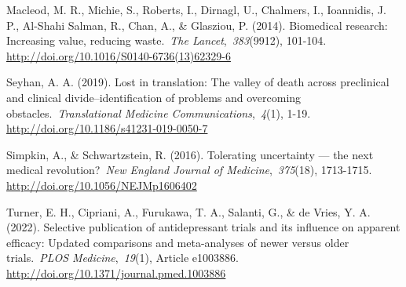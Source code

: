 \documentclass[authordate, empirical]{jote-new-article}
\begin{document}
	Macleod, M. R., Michie, S., Roberts, I., Dirnagl, U., Chalmers, I., Ioannidis, J. P., Al-Shahi Salman, R., Chan, A., \& Glasziou, P. (2014). Biomedical research: Increasing value, reducing waste. \emph{The Lancet}, \emph{383}(9912), 101-104. \url{http://doi.org/10.1016/S0140-6736(13)62329-6} 
	
	Seyhan, A. A. (2019). Lost in translation: The valley of death across preclinical and clinical divide--identification of problems and overcoming obstacles. \emph{Translational Medicine Communications}, \emph{4}(1), 1-19. \url{http://doi.org/10.1186/s41231-019-0050-7}
	
	Simpkin, A., \& Schwartzstein, R. (2016). Tolerating uncertainty — the next medical revolution? \emph{New England Journal of Medicine}, \emph{375}(18), 1713-1715. \url{http://doi.org/10.1056/NEJMp1606402} 
	
	Turner, E. H., Cipriani, A., Furukawa, T. A., Salanti, G., \& de Vries, Y. A. (2022). Selective publication of antidepressant trials and its influence on apparent efficacy: Updated comparisons and meta-analyses of newer versus older trials. \emph{PLOS Medicine}, \emph{19}(1), Article e1003886. \url{http://doi.org/10.1371/journal.pmed.1003886}
\end{document}
